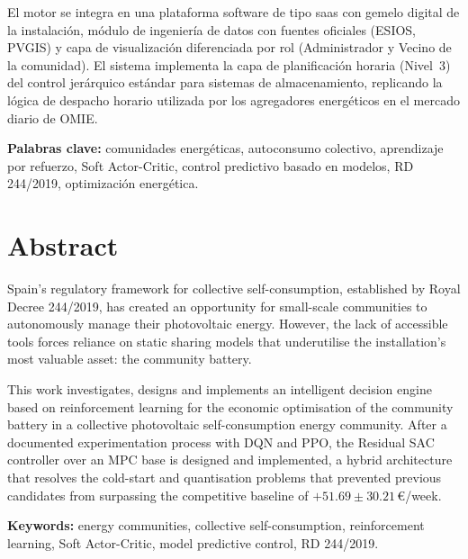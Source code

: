 \documentclass[12pt, a4paper, twoside]{report}
\begin{document}
El motor se integra en una plataforma software de tipo \acrshort{saas} con
gemelo digital de la instalación, módulo de ingeniería de datos con fuentes
oficiales (ESIOS, PVGIS) y capa de visualización diferenciada por rol
(Administrador y Vecino de la comunidad). El sistema implementa la capa de
planificación horaria (Nivel~3) del control jerárquico estándar para sistemas
de almacenamiento, replicando la lógica de despacho horario utilizada por
los agregadores energéticos en el mercado diario de OMIE.

\textbf{Palabras clave:} comunidades energéticas, autoconsumo colectivo,
aprendizaje por refuerzo, Soft Actor-Critic, control predictivo basado en
modelos, RD 244/2019, optimización energética.

\chapter*{Abstract}
\thispagestyle{plain}

Spain's regulatory framework for collective self-consumption, established by
Royal Decree 244/2019, has created an opportunity for small-scale communities
to autonomously manage their photovoltaic energy. However, the lack of
accessible tools forces reliance on static sharing models that underutilise
the installation's most valuable asset: the community battery.

This work investigates, designs and implements an intelligent decision engine
based on reinforcement learning for the economic optimisation of the community
battery in a collective photovoltaic self-consumption energy community. After
a documented experimentation process with DQN and PPO, the Residual SAC
controller over an MPC base is designed and implemented, a hybrid architecture
that resolves the cold-start and quantisation problems that prevented previous
candidates from surpassing the competitive baseline of
$+51.69 \pm 30.21$\,€/week.

\textbf{Keywords:} energy communities, collective self-consumption,
reinforcement learning, Soft Actor-Critic, model predictive control,
RD 244/2019.

\tableofcontents
\listoffigures
{}
\listoftables
{}
\printglossary[type=acronym, title={Glosario de Acrónimos}]

\setcounter{page}{1}
\end{document}
